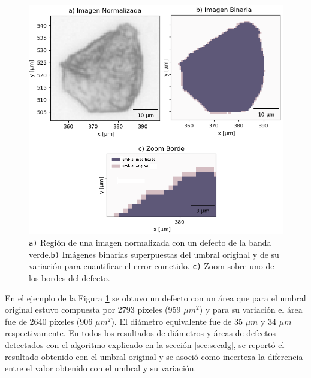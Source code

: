 \begin{figure}[H]
\centering
\includegraphics[scale=1.1]{Figs/cuantificaciondefectos/erroresborde.png}
\caption{\texttt{a)} Región de una imagen normalizada con un defecto de la banda verde.\texttt{b)} Imágenes binarias superpuestas del umbral original y de su variación para cuantificar el error cometido. \texttt{c)} Zoom sobre uno de los bordes del defecto.}
\label{fig:bordedefe}
\end{figure}

En el ejemplo de la Figura \ref{fig:bordedefe} se obtuvo un defecto con un área que para el umbral original estuvo compuesta por 2793 píxeles (959 $\mu m^{2}$) y para su variación el área fue de 2640 píxeles (906 $\mu m^{2}$). El diámetro equivalente fue de 35 $\mu m$ y 34 $\mu m$ respectivamente. En todos los resultados de diámetros y áreas de defectos detectados con el algoritmo explicado en la sección \ref{sec:secalg}, se reportó el resultado obtenido con el umbral original y se asoció como incerteza la diferencia entre el valor obtenido con el umbral y su variación.